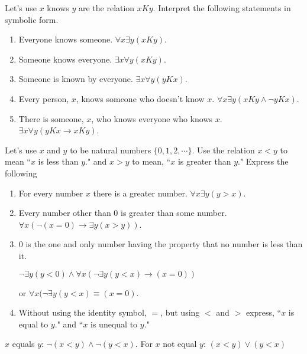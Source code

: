 \newpage
\begin{problem}
 Let's use $x$ knows $y$ are the relation $xKy$.   Interpret the following statements in symbolic form.
\begin{enumerate}
\item Everyone knows someone. \hfill
\ifKey 
\color{red}$\forall x \exists y(xKy)$.
\color{black}
 \else
 
\vspace{1em} 
\fi

\item Someone knows everyone.\hfill
\ifKey 
\color{red}$\exists x \forall y(xKy)$.
\color{black}
 \else
{}		 
\fi

\item Someone is known by everyone.\hfill
\ifKey 
\color{red}$\exists x\forall y(yKx)$.
\color{black}
 \else
{}		 
\fi
\item Every person, $x$, knows someone who doesn't know $x$.\hfill
\ifKey 
\color{red}$\forall x\exists y(xKy \land \neg yKx)$.
\color{black}
 \else
{}		 
\fi

\item There is someone, $x$, who knows everyone who knows $x$.\hfill
\ifKey 
\color{red}$\exists x\forall y(yKx \rightarrow xKy)$.
\color{black}
 \else
{}		 
\fi
\end{enumerate}
\end{problem}


\begin{problem} 
Let's use $x$ and $y$ to be natural numbers $\{0, 1, 2,\cdots\}$. Use the relation $x<y$ to mean ``$x$ is less than $y$." and $x>y$ to mean, ``$x$ is greater than $y$."  Express the following  

\begin{enumerate}
\item For every number $x$ there is a greater number.\hfill
\ifKey 
\color{red}$\forall x\exists y(y>x)$.
\color{black}
 \else
{}		 
\fi
\item Every number other than $0$ is greater than some number.\hfill
\ifKey 
\color{red}$\forall x(\neg(x=0)\rightarrow \exists y(x>y))$.
\color{black}
 \else
{}		 
\fi
\item $0$ is the one and only number having the property that no number is less than it.

\ifKey 
\color{red}
\hfill$\neg\exists y(y<0)\land \forall x(\neg\exists y(y<x)\rightarrow(x=0))$ 

\hfill or $\forall x(\neg \exists y (y<x)\equiv (x=0)$.
\color{black}
 \else
{}		 
\fi
\item Without using the identity symbol, $=$, but using $<$ and $>$ express, ``$x$ is equal to $y$." and ``$x$ is unequal to $y$."
\end{enumerate}
\hfill
\ifKey 
\color{red}$x$ equals $y$:  $\neg(x<y) \land \neg(y<x)$.  For $x$ not equal $y$: $(x<y)\lor(y<x)$
\color{black}
 \else
{}		 
\fi
\end{problem}

